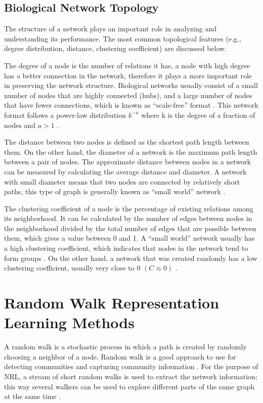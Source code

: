 \subsection{Biological Network Topology}

The structure of a network plays an important role in analyzing and understanding its performance. The most common topological features (e.g., degree distribution, distance, clustering coefficient) are discussed below.

The degree of a node is the number of relations it has, a node with high degree has a better connection in the network, therefore it plays a more important role in preserving the network structure.
Biological networks usually consist of a small number of nodes that are highly connected (hubs), and a large number of nodes that have fewer connections, which is known as “scale-free” format \cite{zhu_getting_2007}. This network format follows a power-law distribution $k^{-a}$ where k is the degree of a fraction of nodes and $a>1$ \cite{broido_scale-free_2019}.

The distance between two nodes is defined as the shortest path length between them. On the other hand, the diameter of a network is the maximum path length between a pair of nodes.
The approximate distance between nodes in a network can be measured by calculating the average distance and diameter. A network with small diameter means that two nodes are connected by relatively short paths, this type of graph is generally known as “small world” network \cite{zhu_getting_2007}.

The clustering coefficient of a node is the percentage of existing relations among its neighborhood.
It can be calculated by the number of edges between nodes in the neighborhood divided by the total number of edges that are possible between them, which gives a value between 0 and 1.
A “small world” network usually has a high clustering coefficient, which indicates that nodes in the network tend to form groups \cite{zhu_getting_2007}. On the other hand, a network that was created randomly has a low clustering coefficient, usually very close to 0 $(C \approx 0)$ \cite{newman_random_2002}.

\section{Random Walk Representation Learning Methods}

A random walk is a stochastic process in which a path is created by randomly choosing a neighbor of a node.
Random walk is a good approach to use for detecting communities and capturing community information \cite{perozzi_deepwalk:_2014}.
For the purpose of \ac{NRL}, a stream of short random walks is used to extract the network information; this way several walkers can be used to explore different parts of the same graph at the same time \cite{perozzi_deepwalk:_2014}.

